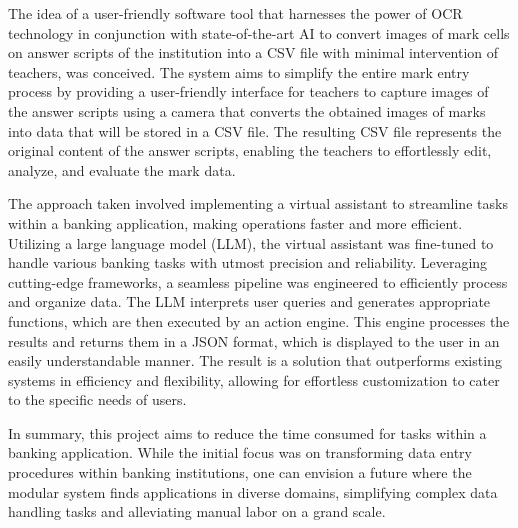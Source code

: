 \vspace{3mm}

\noindent The idea of a user-friendly software tool that harnesses the power of OCR technology in conjunction with state-of-the-art AI to convert images of mark cells on answer scripts of the institution into a CSV file with minimal intervention of teachers, was conceived. The system aims to simplify the entire mark entry process by providing a user-friendly interface for teachers to capture images of the answer scripts using a camera that converts the obtained images of marks into data that will be stored in a CSV file. The resulting CSV file represents the original content of the answer scripts, enabling the teachers to effortlessly edit, analyze, and evaluate the mark data.

\vspace{3mm}

\noindent The approach taken involved implementing a virtual assistant to streamline tasks within a banking application, making operations faster and more efficient. Utilizing a large language model (LLM), the virtual assistant was fine-tuned to handle various banking tasks with utmost precision and reliability. Leveraging cutting-edge frameworks, a seamless pipeline was engineered to efficiently process and organize data. The LLM interprets user queries and generates appropriate functions, which are then executed by an action engine. This engine processes the results and returns them in a JSON format, which is displayed to the user in an easily understandable manner. The result is a solution that outperforms existing systems in efficiency and flexibility, allowing for effortless customization to cater to the specific needs of users.

\vspace{3mm}

\noindent In summary, this project aims to reduce the time consumed for tasks within a banking application. While the initial focus was on transforming data entry procedures within banking institutions, one can envision a future where the modular system finds applications in diverse domains, simplifying complex data handling tasks and alleviating manual labor on a grand scale.



\tableofcontents
\printnomenclature
\listoffigures
\listoftables
\clearpage



